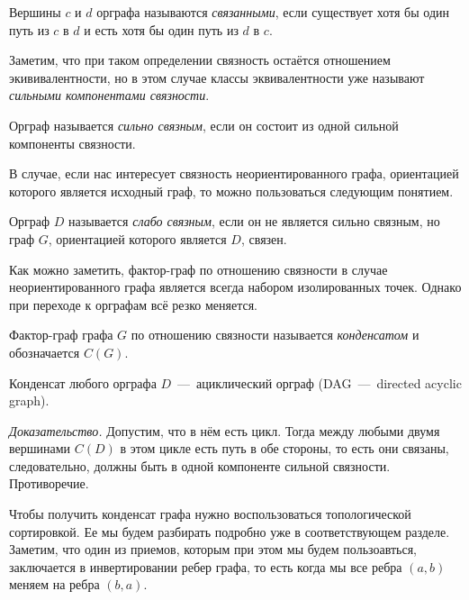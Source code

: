 \begin{definition}
	Вершины $c$ и $d$ орграфа называются \emph{связанными}, если существует хотя бы один путь из $c$ в $d$ и 
	есть хотя бы один путь из $d$ в $c$.
\end{definition}	 

	Заметим, что при таком определении связность остаётся отношением экививалентности, но в этом случае 
	классы эквивалентности уже называют \emph{сильными компонентами связности}.
	
\begin{definition}
	Орграф называется \emph{сильно связным}, если он состоит из одной сильной компоненты связности. 
\end{definition}

	В случае, если нас интересует связность неориентированного графа, ориентацией которого является исходный граф, 
	то можно пользоваться следующим понятием.

\begin{definition}
	Орграф $D$ называется \emph{слабо связным}, если он не является сильно связным, но граф $G$, ориентацией которого является $D$, связен.
\end{definition}

	Как можно заметить, фактор-граф по отношению связности в случае неориентированного графа является всегда 
	набором изолированных точек. Однако при переходе к орграфам всё резко меняется.

\begin{definition}
	Фактор-граф графа $G$ по отношению связности называется \emph{конденсатом} и обозначается $C(G)$.
\end{definition}

\begin{theorem}
	Конденсат любого орграфа $D$~---~ациклический орграф (DAG~---~directed acyclic graph).
	
	\emph{Доказательство.} Допустим, что в нём есть цикл. Тогда между любыми двумя вершинами $C(D)$ в этом цикле 
	есть путь в обе стороны, то есть они связаны, следовательно, должны быть в одной компоненте сильной связности. Противоречие.
\end{theorem}

	Чтобы получить конденсат графа нужно воспользоваться топологической сортировкой. Ее мы будем разбирать подробно 
	уже в соответствующем разделе. Заметим, что один из приемов, которым при этом мы будем пользоавться, 
	заключается в инвертировании ребер графа, то есть когда мы все ребра $(a, b)$ меняем на ребра $(b, a)$.

